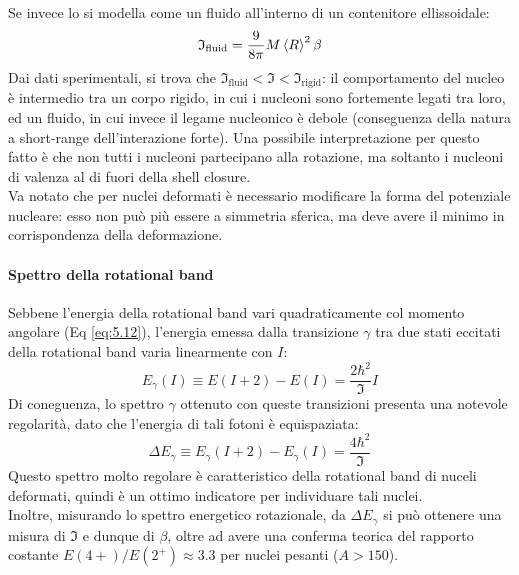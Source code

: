 Se invece lo si modella come un fluido all'interno di un contenitore ellissoidale:
\begin{equation}
	\mathfrak{I}_{\text{fluid}} = \frac{9}{8\pi} M \braket{R}^2 \beta
	\label{eq:5.14}
\end{equation}
Dai dati sperimentali, si trova che $ \mathfrak{I}_{\text{fluid}} < \mathfrak{I} < \mathfrak{I}_{\text{rigid}} $: il comportamento del nucleo è intermedio tra un corpo rigido, in cui i nucleoni sono fortemente legati tra loro, ed un fluido, in cui invece il legame nucleonico è debole (conseguenza della natura a short-range dell'interazione forte). Una possibile interpretazione per questo fatto è che non tutti i nucleoni partecipano alla rotazione, ma soltanto i nucleoni di valenza al di fuori della shell closure.\\
Va notato che per nuclei deformati è necessario modificare la forma del potenziale nucleare: esso non può più essere a simmetria sferica, ma deve avere il minimo in corrispondenza della deformazione.

\paragraph{Spettro della rotational band}

Sebbene l'energia della rotational band vari quadraticamente col momento angolare (Eq \ref{eq:5.12}), l'energia emessa dalla transizione $ \gamma $ tra due stati eccitati della rotational band varia linearmente con $ I $:
\begin{equation}
	E_{\gamma}(I) \equiv E(I + 2) - E(I) = \frac{2\hbar^2}{\mathfrak{I}} I
	\label{eq:5.15}
\end{equation}
Di coneguenza, lo spettro $ \gamma $ ottenuto con queste transizioni presenta una notevole regolarità, dato che l'energia di tali fotoni è equispaziata:
\begin{equation}
	\Delta E_{\gamma} \equiv E_{\gamma}(I + 2) - E_{\gamma}(I) = \frac{4\hbar^2}{\mathfrak{I}}
	\label{eq:5.16}
\end{equation}
Questo spettro molto regolare è caratteristico della rotational band di nuceli deformati, quindi è un ottimo indicatore per individuare tali nuclei.\\
Inoltre, misurando lo spettro energetico rotazionale, da $ \Delta E_{\gamma} $ si può ottenere una misura di $ \mathfrak{I} $ e dunque di $ \beta $, oltre ad avere una conferma teorica del rapporto costante $ E(4+) / E(2^+) \approx 3.3 $ per nuclei pesanti ($ A > 150 $).

